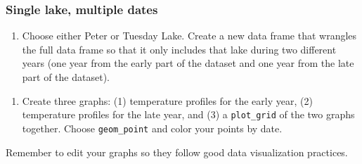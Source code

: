 \documentclass[]{article}
\newenvironment{Shaded}{\begin{snugshade}}{\end{snugshade}}
\newcommand{\CommentTok}[1]{\textcolor[rgb]{0.56,0.35,0.01}{\textit{#1}}}
\newcommand{\FloatTok}[1]{\textcolor[rgb]{0.00,0.00,0.81}{#1}}
\newcommand{\KeywordTok}[1]{\textcolor[rgb]{0.13,0.29,0.53}{\textbf{#1}}}
\newcommand{\NormalTok}[1]{#1}
\newcommand{\OperatorTok}[1]{\textcolor[rgb]{0.81,0.36,0.00}{\textbf{#1}}}
\newcommand{\StringTok}[1]{\textcolor[rgb]{0.31,0.60,0.02}{#1}}
\providecommand{\tightlist}{%
  \setlength{\itemsep}{0pt}\setlength{\parskip}{0pt}}
\begin{document}
\hypertarget{single-lake-multiple-dates}{%
\subsubsection{Single lake, multiple
dates}\label{single-lake-multiple-dates}}

\begin{enumerate}
\def\labelenumi{\arabic{enumi}.}
\setcounter{enumi}{4}
\tightlist
\item
  Choose either Peter or Tuesday Lake. Create a new data frame that
  wrangles the full data frame so that it only includes that lake during
  two different years (one year from the early part of the dataset and
  one year from the late part of the dataset).
\end{enumerate}

\begin{Shaded}
\end{Shaded}

\begin{enumerate}
\def\labelenumi{\arabic{enumi}.}
\setcounter{enumi}{5}
\tightlist
\item
  Create three graphs: (1) temperature profiles for the early year, (2)
  temperature profiles for the late year, and (3) a \texttt{plot\_grid}
  of the two graphs together. Choose \texttt{geom\_point} and color your
  points by date.
\end{enumerate}

Remember to edit your graphs so they follow good data visualization
practices.
\end{document}
